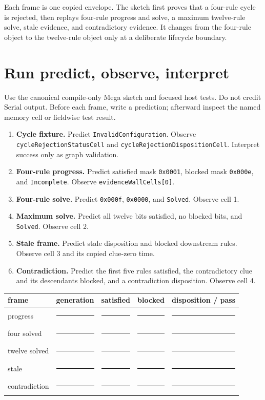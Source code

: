 \documentclass[10pt]{article}
\newcommand{\blankline}{\rule{0.72in}{0.4pt}}
\newcommand{\longblank}{\rule{1.25in}{0.4pt}}
\begin{document}
Each frame is one copied envelope. The sketch first proves that a four-rule
cycle is rejected, then replays four-rule progress and solve, a maximum
twelve-rule solve, stale evidence, and contradictory evidence. It changes
from the four-rule object to the twelve-rule object only at a deliberate
lifecycle boundary.

\section{Run predict, observe, interpret}
Use the canonical compile-only Mega sketch and focused host tests. Do not
credit Serial output. Before each frame, write a prediction; afterward inspect
the named memory cell or fieldwise test result.

\begin{enumerate}
 \item \textbf{Cycle fixture.} Predict
       \texttt{InvalidConfiguration}. Observe
       \texttt{cycleRejectionStatusCell} and
       \texttt{cycleRejectionDispositionCell}. Interpret success only as
       graph validation.
 \item \textbf{Four-rule progress.} Predict satisfied mask
       \texttt{0x0001}, blocked mask \texttt{0x000e}, and
       \texttt{Incomplete}. Observe \texttt{evidenceWallCells[0]}.
 \item \textbf{Four-rule solve.} Predict \texttt{0x000f},
       \texttt{0x0000}, and \texttt{Solved}. Observe cell 1.
 \item \textbf{Maximum solve.} Predict all twelve bits satisfied,
       no blocked bits, and \texttt{Solved}. Observe cell 2.
 \item \textbf{Stale frame.} Predict stale disposition and blocked
       downstream rules. Observe cell 3 and its copied clue-zero time.
 \item \textbf{Contradiction.} Predict the first five rules satisfied,
       the contradictory clue and its descendants blocked, and a
       contradiction disposition. Observe cell 4.
\end{enumerate}

\begin{tabularx}{\linewidth}{@{}l l l l X@{}}
\toprule
frame & generation & satisfied & blocked & disposition / pass\\
\midrule
progress & \blankline & \blankline & \blankline & \longblank\\[7pt]
four solved & \blankline & \blankline & \blankline & \longblank\\[7pt]
twelve solved & \blankline & \blankline & \blankline & \longblank\\[7pt]
stale & \blankline & \blankline & \blankline & \longblank\\[7pt]
contradiction & \blankline & \blankline & \blankline & \longblank\\
\bottomrule
\end{tabularx}
\end{document}
